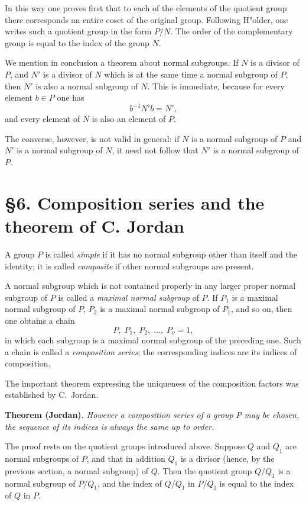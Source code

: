 \documentclass[11pt]{article}
\begin{document}
In this way one proves first that to each of the elements of the quotient group there corresponds an entire coset of the original group. Following H"older, one writes such a quotient group in the form $P/N$. The order of the complementary group is equal to the index of the group $N$.

We mention in conclusion a theorem about normal subgroups. If $N$ is a divisor of $P$, and $N'$ is a divisor of $N$ which is at the same time a normal subgroup of $P$, then $N'$ is also a normal subgroup of $N$. This is immediate, because for every element $b\in P$ one has
\[
 b^{-1}N'b = N',
\]
and every element of $N$ is also an element of $P$.

The converse, however, is not valid in general: if $N$ is a normal subgroup of $P$ and $N'$ is a normal subgroup of $N$, it need not follow that $N'$ is a normal subgroup of $P$.

\section*{§6. Composition series and the theorem of C. Jordan}
A group $P$ is called \emph{simple} if it has no normal subgroup other than itself and the identity; it is called \emph{composite} if other normal subgroups are present.

A normal subgroup which is not contained properly in any larger proper normal subgroup of $P$ is called a \emph{maximal normal subgroup} of $P$. If $P_1$ is a maximal normal subgroup of $P$, $P_2$ is a maximal normal subgroup of $P_1$, and so on, then one obtains a chain
\[
 P,\; P_1,\; P_2,\; \dots,\; P_\nu = 1,
\]
in which each subgroup is a maximal normal subgroup of the preceding one. Such a chain is called a \emph{composition series}; the corresponding indices are its indices of composition.

The important theorem expressing the uniqueness of the composition factors was established by C.~Jordan.

\medskip
\noindent\textbf{Theorem (Jordan).} \emph{However a composition series of a group $P$ may be chosen, the sequence of its indices is always the same up to order.}
\medskip

The proof rests on the quotient groups introduced above. Suppose $Q$ and $Q_1$ are normal subgroups of $P$, and that in addition $Q_1$ is a divisor (hence, by the previous section, a normal subgroup) of $Q$. Then the quotient group $Q/Q_1$ is a normal subgroup of $P/Q_1$, and the index of $Q/Q_1$ in $P/Q_1$ is equal to the index of $Q$ in $P$.
\end{document}
